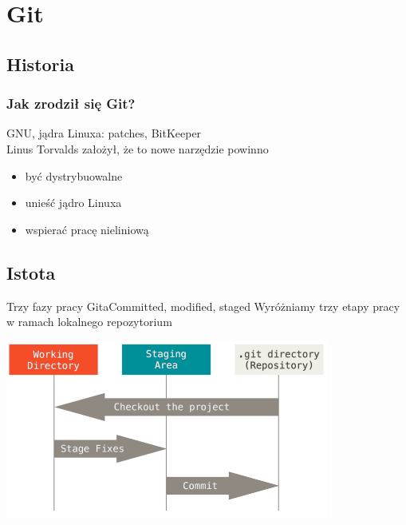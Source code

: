 \documentclass{beamer}
\begin{document}
\section{Git}
\subsection{Historia}
\begin{frame}
 \frametitle{Jak zrodził się Git?}
GNU, jądra Linuxa: patches, BitKeeper \\
Linus Torvalds założył, że to nowe narzędzie powinno \\
  \begin{itemize}
  \item być dystrybuowalne
  \item unieść jądro Linuxa
  \item wspierać pracę nieliniową
 \end{itemize}
\end{frame}

\subsection{Istota}

\begin{frame}{Trzy fazy pracy Gita}{Committed, modified, staged}
 Wyróżniamy trzy etapy pracy w ramach lokalnego repozytorium
  \begin{center}
   \includegraphics[width=0.8\textwidth]{./obrazki/fig-1_6.png}
 \end{center}
\end{frame}
\end{document}
